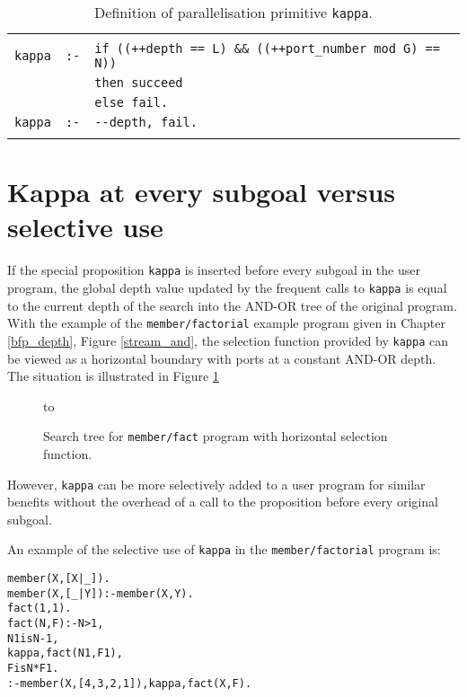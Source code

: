 \begin{table}[htbp]
{\small
\begin{tabular}{| l l l |}
\hline
& & \\
\verb?kappa? & \verb?:-? & \verb?if ((++depth == L) && ((++port_number mod G) == N))? \\
 & & \verb?then succeed? \\
 & & \verb?else fail.? \\
\verb?kappa? & \verb?:-?  & \verb?--depth, fail.?\\
 & & \\
\hline
\end{tabular}
}
\caption{Definition of parallelisation primitive \texttt{kappa}.}
\label{kappa_code}
\end{table}


\section{Kappa at every subgoal versus selective use} %

If the special proposition \texttt{kappa} is inserted before every subgoal in
the user program, the global depth value updated by the frequent calls to
\texttt{kappa} is equal to the current depth of the search into the AND-OR
tree of the original program.  With the example of the \texttt{member/factorial}
example program given in
Chapter \ref{bfp_depth}, Figure \ref{stream_and}, the selection function provided by
\texttt{kappa} can be viewed as a horizontal boundary with ports at a constant
AND-OR depth.  The situation is illustrated in Figure \ref{horiz_ports}

\begin{figure}[htbp]
\vspace{5mm} \hbox to 
\caption{Search tree for \texttt{member/fact} program with horizontal selection function.}
\vspace{5mm}
\label{horiz_ports}
\end{figure}

However, \texttt{kappa} can be more selectively added to a user program for
similar benefits without the overhead of a call to the proposition before
every original subgoal.

\begin{minipage}[h]{\textwidth}  %
An example of the selective use of \texttt{kappa}
in the \texttt{member/factorial} program is:\vspace{2mm}
\begin{alltt}
member(X,[X|_]).
member(X,[_|Y]) :- member(X,Y).\vspace{2mm}
fact(1,1).
fact(N,F) :- N > 1,
             N1 is N - 1,
             kappa, fact(N1,F1),
             F is N * F1.\vspace{2mm}
:- member(X,[4,3,2,1]), kappa, fact(X, F).
\end{alltt}
\end{minipage} %

